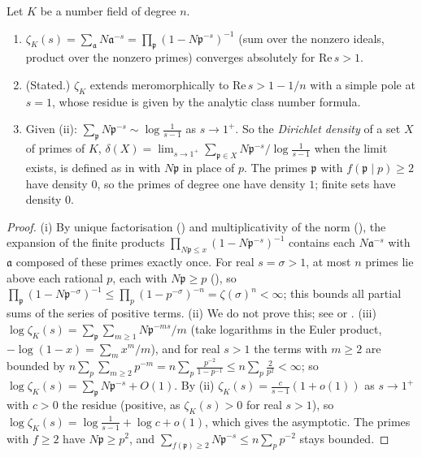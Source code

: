 \begin{proposition}\label{prop:ant:dedekindzeta}
Let $K$ be a number field of degree $n$.
\begin{enumerate}[label=(\roman*)]
\item $\zeta_K(s)=\sum_{\mathfrak a}N\mathfrak a^{-s}=\prod_{\mathfrak p}(1-N\mathfrak p^{-s})^{-1}$ (sum over the nonzero ideals, product over the nonzero primes)
converges absolutely for $\mathrm{Re}\,s>1$.
\item (Stated.) $\zeta_K$ extends meromorphically to $\mathrm{Re}\,s>1-1/n$ with a simple pole at $s=1$, whose residue is given by the analytic class number
formula.
\item Given (ii): $\sum_{\mathfrak p}N\mathfrak p^{-s}\sim\log\frac1{s-1}$ as $s\to1^+$. So the \emph{Dirichlet density} of a set $X$ of primes of $K$,
$\delta(X)=\lim_{s\to1^+}\sum_{\mathfrak p\in X}N\mathfrak p^{-s}\big/\log\frac1{s-1}$ when the limit exists, is defined as in  with $N\mathfrak p$ in
place of $p$. The primes $\mathfrak p$ with $f(\mathfrak p\mid p)\ge2$ have density $0$, so the primes of degree one have density $1$; finite sets have
density $0$.
\end{enumerate}
\end{proposition}

\begin{proof}
(i) By unique factorisation () and multiplicativity of the norm (), the expansion of the finite
products $\prod_{N\mathfrak p\le x}(1-N\mathfrak p^{-s})^{-1}$ contains each $N\mathfrak a^{-s}$ with $\mathfrak a$ composed of these primes exactly once. For real
$s=\sigma>1$, at most $n$ primes lie above each rational $p$, each with $N\mathfrak p\ge p$ (), so
$\prod_{\mathfrak p}(1-N\mathfrak p^{-\sigma})^{-1}\le\prod_p(1-p^{-\sigma})^{-n}=\zeta(\sigma)^n<\infty$; this bounds all partial sums of the series of positive terms.
(ii) We do not prove this; see \cite[Chapter VII, Section 5]{Neukirch} or \cite[Chapter VIII]{LangANT}. (iii) $\log\zeta_K(s)=\sum_{\mathfrak p}\sum_{m\ge1}
N\mathfrak p^{-ms}/m$ (take logarithms in the Euler product, $-\log(1-x)=\sum_mx^m/m$), and for real $s>1$ the terms with $m\ge2$ are bounded by
$n\sum_p\sum_{m\ge2}p^{-m}=n\sum_p\frac{p^{-2}}{1-p^{-1}}\le n\sum_p\frac{2}{p^2}<\infty$; so $\log\zeta_K(s)=\sum_{\mathfrak p}N\mathfrak p^{-s}+O(1)$. By (ii)
$\zeta_K(s)=\frac{c}{s-1}(1+o(1))$ as $s\to1^+$ with $c>0$ the residue (positive, as $\zeta_K(s)>0$ for real $s>1$), so $\log\zeta_K(s)=\log\frac1{s-1}+\log c+o(1)$,
which gives the asymptotic. The primes with $f\ge2$ have $N\mathfrak p\ge p^2$, and $\sum_{f(\mathfrak p)\ge2}N\mathfrak p^{-s}\le n\sum_pp^{-2}$ stays
bounded.
\end{proof}

